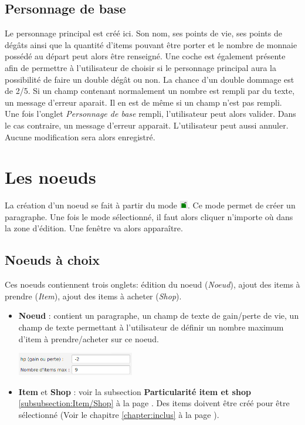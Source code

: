 		\subsection{Personnage de base}
			\label{subsec:main_character}
			Le personnage principal est créé ici. Son nom, ses points de vie, ses points de dégâts ainsi que la quantité d'items pouvant être porter et le nombre de monnaie possédé au départ peut alors être renseigné. Une coche est également présente afin de permettre à l'utilisateur de choisir si le personnage principal aura la possibilité de faire un double dégât ou non. La chance d'un double dommage est de 2/5.
			Si un champ contenant normalement un nombre est rempli par du texte, un message d'erreur aparait. Il en est de même si un champ n'est pas rempli.\\
		\newline
		Une fois l'onglet \textit{Personnage de base} rempli, l'utilisateur peut alors valider. Dans le cas contraire, un message d'erreur apparait. L'utilisateur peut aussi annuler. Aucune modification sera alors enregistré.

	\section{Les noeuds}
		La création d'un noeud se fait à partir du mode \includegraphics[height=10pt]{img/modeEdition.png}. Ce mode permet de créer un paragraphe. Une fois le mode sélectionné, il faut alors cliquer n'importe où dans la zone d'édition. Une fenêtre va alors apparaître.

		\subsection{Noeuds à choix}
			Ces noeuds contiennent trois onglets: édition du noeud (\textit{Noeud}), ajout des items à prendre (\textit{Item}), ajout des items à acheter (\textit{Shop}).

			\begin{itemize}
				\item \textbf{Noeud} : contient un paragraphe, un champ de texte de gain/perte de vie, un champ de texte permettant à l'utilisateur de définir un nombre maximum d'item à prendre/acheter sur ce noeud.
				\begin{center}
					\includegraphics[height=1cm]{img/noeudBasic.png}
				\end{center}

				\item \textbf{Item} et \textbf{Shop} : voir la subsection \textbf{Particularité item et shop} \ref{subsubsection:Item/Shop} à la page \pageref{subsubsection:Item/Shop}. Des items doivent être créé pour être sélectionné (Voir le chapitre \ref{chapter:inclus} à la page \pageref{chapter:inclus}).
			\end{itemize}

